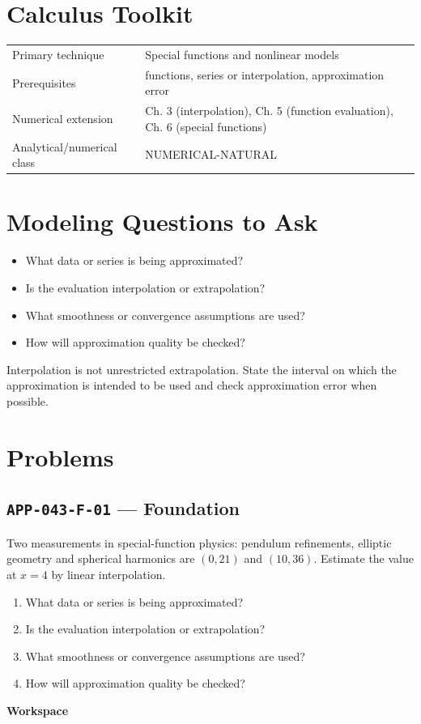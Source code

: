 \documentclass[11pt]{book}
\newcommand{\pid}[1]{\texttt{#1}}
\newcommand{\workspace}{\par\vspace{0.7in}\hrulefill\par\vspace{0.55in}\hrulefill\par}
\begin{document}
\section*{Calculus Toolkit}
\begin{tabularx}{\textwidth}{@{}lX@{}}\toprule
Primary technique & Special functions and nonlinear models \\
Prerequisites & functions, series or interpolation, approximation error \\
Numerical extension & Ch. 3 (interpolation), Ch. 5 (function evaluation), Ch. 6 (special functions) \\
Analytical/numerical class & NUMERICAL-NATURAL \\
\bottomrule\end{tabularx}
\section*{Modeling Questions to Ask}\begin{itemize}
\item What data or series is being approximated?
\item Is the evaluation interpolation or extrapolation?
\item What smoothness or convergence assumptions are used?
\item How will approximation quality be checked?
\end{itemize}
\begin{errorbox}Interpolation is not unrestricted extrapolation. State the interval on which the approximation is intended to be used and check approximation error when possible.\end{errorbox}
\section*{Problems}
\subsection*{\pid{APP-043-F-01} — Foundation}
\begin{problembox}
Two measurements in special-function physics: pendulum refinements, elliptic geometry and spherical harmonics are $(0,21)$ and $(10,36)$. Estimate the value at $x=4$ by linear interpolation.
\end{problembox}
\begin{promptbox}\begin{enumerate}
\item What data or series is being approximated?
\item Is the evaluation interpolation or extrapolation?
\item What smoothness or convergence assumptions are used?
\item How will approximation quality be checked?
\end{enumerate}\end{promptbox}
\textbf{Workspace}\workspace
{}
\end{document}
